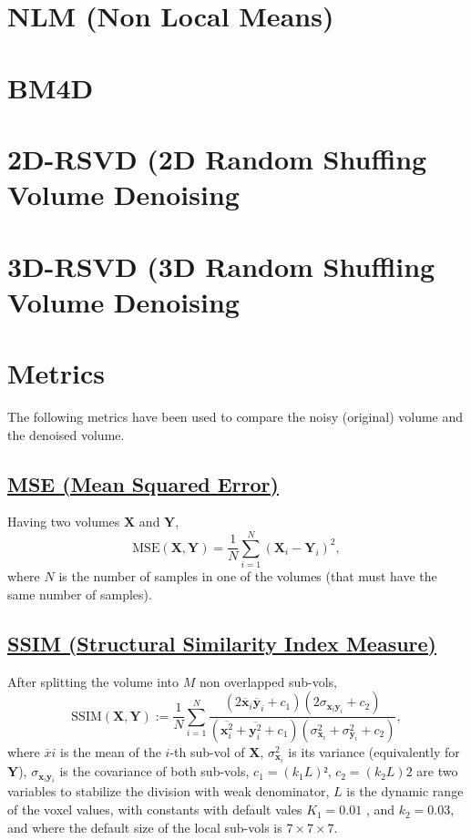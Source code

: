 \documentclass{article}
\begin{document}
\section{NLM (Non Local Means)} 

\section{BM4D}

\section{2D-RSVD (2D Random Shuffing Volume Denoising}

\section{3D-RSVD (3D Random Shuffling Volume Denoising}

\section{Metrics}

The following metrics have been used to compare the noisy (original)
volume and the denoised volume.

\subsection{\href{https://en.wikipedia.org/wiki/Mean_squared_error}{MSE (Mean
    Squared Error)}}

Having two volumes $\mathbf{X}$ and $\mathbf{Y}$,
\begin{equation}
  \text{MSE}(\mathbf{X},\mathbf{Y}) = \frac{1}{N}\sum_{i=1}^N(\mathbf{X}_i - \mathbf{Y}_i)^2,
\end{equation}
where $N$ is the number of samples in one of the volumes (that must
have the same number of samples).

\subsection{\href{https://en.wikipedia.org/wiki/Structural_similarity_index_measure}{SSIM
    (Structural Similarity Index Measure)}}

After splitting the volume into $M$ non overlapped sub-vols,
\begin{equation}
  \text{SSIM}(\mathbf{X}, \mathbf{Y}) := \frac{1}{N} \sum_{i=1}^N \frac{(2\overline{\mathbf{x}}_i \overline{\mathbf{y}}_i + c_1)(2\sigma_{\mathbf{x}_i \mathbf{y}_i} + c_2)}{(\overline{\mathbf{x}_i^2} + \overline{\mathbf{y}_i^2} + c_1)(\sigma^2_{\mathbf{x}_i} + \sigma^2_{\mathbf{y}_i} + c_2)},
\end{equation}
where $\overline{x}i$ is the mean of the $i$-th sub-vol of
$\mathbf{X}$, $\sigma^2_{\mathbf{x}_i}$ is its variance (equivalently
for $\mathbf{Y}$), $\sigma_{\mathbf{x}_i\mathbf{y}_i}$ is the
covariance of both sub-vols, $c_1=(k_1L) ²$, $c_2=(k_2L) 2$ are two
variables to stabilize the division with weak denominator, $L$ is the
dynamic range of the voxel values, with constants with default vales
$K_1=0.01$ , and $k_2=0.03$, and where the default size of the local
sub-vols is $7\times 7\times 7$.
\end{document}
